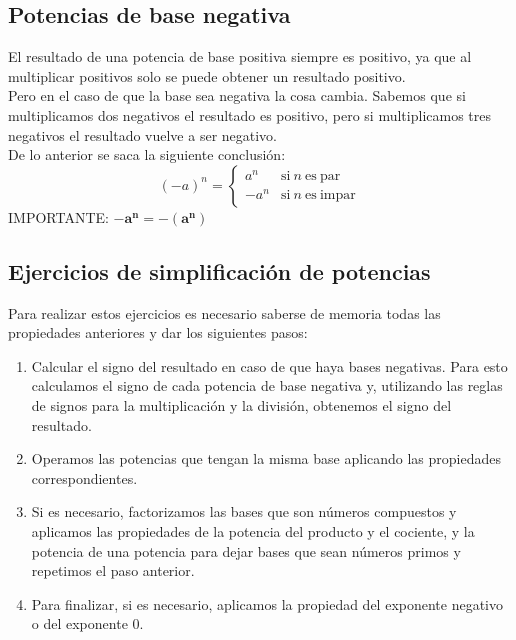 \documentclass[a4paper,11pt,answers]{exam}
\begin{document}
\subsection{Potencias de base negativa}
El resultado de una potencia de base positiva siempre es positivo, ya que al multiplicar positivos solo se puede obtener un resultado positivo.\\

Pero en el caso de que la base sea negativa la cosa cambia. Sabemos que si multiplicamos dos negativos el resultado es positivo, pero si multiplicamos tres negativos el resultado vuelve a ser negativo.\\
De lo anterior se saca la siguiente conclusión:
\[(-a)^n = \left\lbrace
\begin{array}{rl}
a^n & \mathrm{si\ }n\ \mathrm{es\ par}\\
-a^n & \mathrm{si\ }n\ \mathrm{es\ impar}
\end{array} 
\right.
\]
IMPORTANTE: $\boldsymbol{-a^n = -\left(a^n \right)}$
\subsection{Ejercicios de simplificación de potencias}
Para realizar estos ejercicios es necesario saberse de memoria todas las propiedades anteriores y dar los siguientes pasos:
\begin{enumerate}
	\item Calcular el signo del resultado en caso de que haya bases negativas. Para esto calculamos el signo de cada potencia de base negativa y, utilizando las reglas de signos para la multiplicación y la división, obtenemos el signo del resultado.
	\item Operamos las potencias que tengan la misma base aplicando las propiedades correspondientes.
	\item Si es necesario, factorizamos las bases que son números compuestos y aplicamos las propiedades de la potencia del producto y el cociente, y la potencia de una potencia para dejar bases que sean números primos y repetimos el paso anterior.
	\item Para finalizar, si es necesario, aplicamos la propiedad del exponente negativo o del exponente 0.
\end{enumerate}
\end{document}
